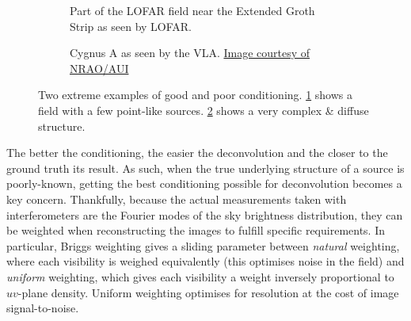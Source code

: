 \begin{figure}[h!]
\centering
\begin{subfigure}{.45\textwidth}
\caption{\label{fig.point} Part of the LOFAR field near the Extended Groth Strip as seen by LOFAR.}
\end{subfigure}
\hfill
\begin{subfigure}{.53\textwidth}
\caption{\label{fig.cyga} Cygnus A as seen by the VLA. \href{http://images.nrao.edu/110}{Image courtesy of NRAO/AUI}}
\end{subfigure}
\caption{\label{fig.conditioning} Two extreme examples of good and poor conditioning. \cref{fig.point} shows a field with a few point-like sources. \cref{fig.cyga} shows a very complex \& diffuse structure.}
\end{figure}

\pg
The better the conditioning, the easier the deconvolution and the closer to the ground truth its result. As such, when the true underlying structure of a source is poorly-known, getting the best conditioning possible for deconvolution becomes a key concern. Thankfully, because the actual measurements taken with interferometers are the Fourier modes of the sky brightness distribution, they can be weighted when reconstructing the images to fulfill specific requirements. In particular, Briggs weighting  gives a sliding parameter between \emph{natural} weighting, where each visibility is weighed equivalently (this optimises noise in the field) and \emph{uniform} weighting, which gives each visibility a weight inversely proportional to $uv$-plane density. Uniform weighting optimises for resolution at the cost of image signal-to-noise.

